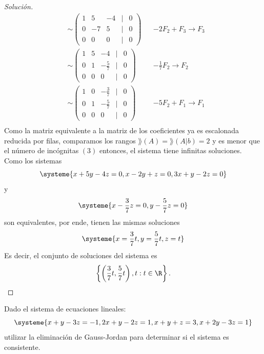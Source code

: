 \documentclass[a4,11pt]{aleph-notas}
\begin{document}
\begin{proof}[Solución]
\begin{align*}
      & \sim 
      \begin{pmatrix}
        1&5&-4&|&0\\
        0&-7&5&|&0\\
        0&0&0&|&0
      \end{pmatrix}
      && -2F_2+F_3\to F_3\\
      & \sim 
      \begin{pmatrix}
        1&5&-4&|&0\\
        0&1&-\frac{5}{7}&|&0\\
        0&0&0&|&0
      \end{pmatrix}
      && -\frac{1}{7}F_2\to F_2\\
      & \sim 
      \begin{pmatrix}
        1&0&-\frac{3}{7}&|&0\\
        0&1&-\frac{5}{7}&|&0\\
        0&0&0&|&0
      \end{pmatrix}
      && -5F_2+F_1\to F_1\\
      \end{align*}
      Como la matriz equivalente a la matriz de los coeficientes ya es escalonada reducida por filas, comparamos los rangos $\rang (A) = \rang (A|b) = 2$ y es menor que el número de incógnitas $(3)$ entonces, el sistema tiene infinitas soluciones. Como los sistemas
      \[
      \systeme{x+5y-4z=0, x-2y+z=0, 3x+y-2z=0}
      \]
      y
      \[
      \systeme{x-\frac{3}{7}z=0, y-\frac{5}{7}z=0}
      \]
      son equivalentes, por ende, tienen las mismas soluciones
      \[
      \systeme{x=\frac{3}{7}t, y=\frac{5}{7}t, z=t}
      \]
      Es decir, el conjunto de soluciones del sistema es
      \[
      \left\{ \left( \frac{3}{7}t,\frac{5}{7}t\right),t:t \in \R \right\}.\qedhere
      \]
\end{proof}


\begin{ejer}
    Dado el sistema de ecuaciones lineales:
    \[
        \systeme{x+y-3z=-1, 2x+y-2z=1, x+y+z=3, x+2y-3z=1}
    \]
    utilizar la eliminación de Gauss-Jordan para determinar si el sistema es consistente.
\end{ejer}
\end{document}
